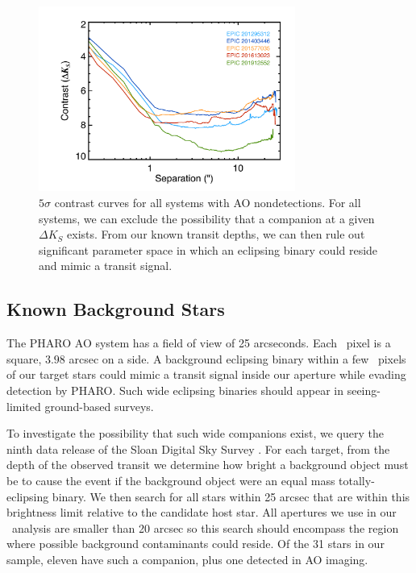 \begin{figure}[htbp]
\centerline{\includegraphics[width=0.75\textwidth]{chapter7/f4.pdf}}
\caption[$5\sigma$ contrast curves for all systems with AO nondetections]{$5\sigma$ contrast curves for all systems with AO nondetections.
For all systems, we can exclude the possibility that a companion at a given $\Delta K_S$
exists.
From our known transit depths, we can then rule out significant parameter space in which
an eclipsing binary could reside and mimic a transit signal.}
\label{Fig:CC}
\end{figure}



\subsection{Known Background Stars}
\label{sec:background}
The PHARO AO system has a field of view of 25 arcseconds.
Each \KT\ pixel is a square, $3.98$ arcsec on a side.
A background eclipsing binary within a few \KT\ pixels of our target
stars could mimic a transit signal inside our aperture while evading detection
by PHARO.
Such wide eclipsing binaries should appear in seeing-limited ground-based
surveys.

To investigate the possibility that such wide companions exist,
we query the ninth data release of the Sloan Digital Sky Survey
\citep[SDSS DR9,][]{Ahn12}.
For each target, from the depth of the observed transit we determine how
bright a background object must be to cause the event if the background
object were an equal mass totally-eclipsing binary.
We then search for all stars within 25 arcsec that are within this brightness
limit relative to the candidate host star.
All apertures we use in our \KT\ analysis are smaller than 20 arcsec so this
search should encompass the region where possible background
contaminants could reside.
Of the 31 stars in our sample, eleven have such a companion, plus one
detected in AO imaging.



